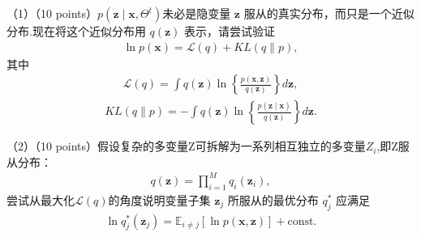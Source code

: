 \documentclass[answers]{exam}  %
\begin{document}
\begin{questions}
\begin{parts}
    （1）（10 points）$p(\mathbf{z} \mid \mathbf{x}, \Theta^t)$未必是隐变量 $\mathbf{z}$ 服从的真实分布，而只是一个近似分布.现在将这个近似分布用 $q(\mathbf{z})$ 表示，请尝试验证
    \begin{align}
    \ln p(\mathbf{x}) = \mathcal{L}(q) + KL(q \parallel p), 
    \end{align}
    其中
    \begin{align}
    \mathcal{L}(q) = \int q(\mathbf{z}) \ln \left\{ \frac{p(\mathbf{x}, \mathbf{z})}{q(\mathbf{z})} \right\} d\mathbf{z}, 
    \end{align}
    \begin{align}
    KL(q \parallel p) = -\int q(\mathbf{z}) \ln \left\{ \frac{p(\mathbf{z} \mid \mathbf{x})}{q(\mathbf{z})} \right\} d\mathbf{z}.
    \end{align}

    （2）（10 points）假设复杂的多变量Z可拆解为一系列相互独立的多变量$Z_{i}$,即Z服从分布：
    \begin{align}
        q(\mathbf{z}) = \prod_{i=1}^M q_i(\mathbf{z}_i),
    \end{align}
    尝试从最大化$\mathcal{L}(q)$的角度说明变量子集 $\mathbf{z}_j$ 所服从的最优分布 $q_j^*$ 应满足
    \begin{align}
    \ln q_j^*(\mathbf{z}_j) = \mathbb{E}_{i \neq j}[\ln p(\mathbf{x}, \mathbf{z})] + \text{const}.
    \end{align}

\end{parts}

\begin{solution}
\end{solution}
\end{questions}
\end{document}
